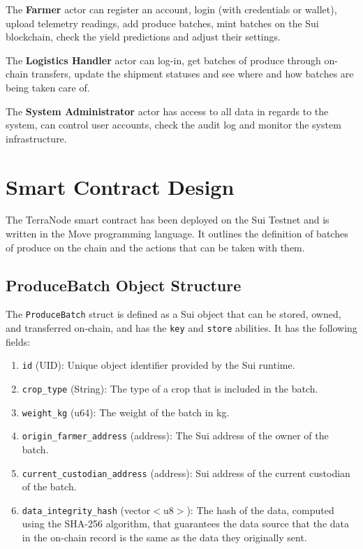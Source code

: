 The \textbf{Farmer} actor can register an account, login (with credentials or wallet), upload telemetry readings, add produce batches, mint batches on the Sui blockchain, check the yield predictions and adjust their settings.

The \textbf{Logistics Handler} actor can log-in, get batches of produce through on-chain transfers, update the shipment statuses and see where and how batches are being taken care of.

The \textbf{System Administrator} actor has access to all data in regards to the system, can control user accounts, check the audit log and monitor the system infrastructure.

\section{Smart Contract Design}

The TerraNode smart contract has been deployed on the Sui Testnet and is written in the Move programming language. It outlines the definition of batches of produce on the chain and the actions that can be taken with them.

\subsection{ProduceBatch Object Structure}

The \texttt{ProduceBatch} struct is defined as a Sui object that can be stored, owned, and transferred on-chain, and has the \texttt{key} and \texttt{store} abilities. It has the following fields:

\begin{enumerate}[label=(\roman*)]
    \item \texttt{id} (UID): Unique object identifier provided by the Sui runtime.
    \item \texttt{crop\_type} (String): The type of a crop that is included in the batch.
    \item \texttt{weight\_kg} (u64): The weight of the batch in kg.
    \item \texttt{origin\_farmer\_address} (address): The Sui address of the owner of the batch.
    \item \texttt{current\_custodian\_address} (address): Sui address of the current custodian of the batch.
    \item \texttt{data\_integrity\_hash} (vector$<$u8$>$): The hash of the data, computed using the SHA-256 algorithm, that guarantees the data source that the data in the on-chain record is the same as the data they originally sent.
\end{enumerate}

